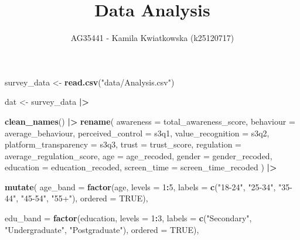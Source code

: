 \documentclass[
]{article}
\title{Data Analysis}
\author{AG35441 - Kamila Kwiatkowska (k25120717)}
\date{}
\newenvironment{Shaded}{\begin{snugshade}}{\end{snugshade}}
\newcommand{\AttributeTok}[1]{\textcolor[rgb]{0.13,0.29,0.53}{#1}}
\newcommand{\ConstantTok}[1]{\textcolor[rgb]{0.56,0.35,0.01}{#1}}
\newcommand{\DecValTok}[1]{\textcolor[rgb]{0.00,0.00,0.81}{#1}}
\newcommand{\FunctionTok}[1]{\textcolor[rgb]{0.13,0.29,0.53}{\textbf{#1}}}
\newcommand{\NormalTok}[1]{#1}
\newcommand{\OtherTok}[1]{\textcolor[rgb]{0.56,0.35,0.01}{#1}}
\newcommand{\SpecialCharTok}[1]{\textcolor[rgb]{0.81,0.36,0.00}{\textbf{#1}}}
\newcommand{\StringTok}[1]{\textcolor[rgb]{0.31,0.60,0.02}{#1}}
\begin{document}
\maketitle

\begin{Shaded}
\begin{Highlighting}[]
\NormalTok{survey\_data }\OtherTok{\textless{}{-}} \FunctionTok{read.csv}\NormalTok{(}\StringTok{"data/Analysis.csv"}\NormalTok{)}

\NormalTok{dat }\OtherTok{\textless{}{-}}\NormalTok{ survey\_data }\SpecialCharTok{|\textgreater{}} 
  
\FunctionTok{clean\_names}\NormalTok{() }\SpecialCharTok{|\textgreater{}}
  \FunctionTok{rename}\NormalTok{(}
    \AttributeTok{awareness             =}\NormalTok{ total\_awareness\_score,}
    \AttributeTok{behaviour             =}\NormalTok{ average\_behaviour,}
    \AttributeTok{perceived\_control     =}\NormalTok{ s3q1,}
    \AttributeTok{value\_recognition     =}\NormalTok{ s3q2,}
    \AttributeTok{platform\_transparency =}\NormalTok{ s3q3,}
    \AttributeTok{trust                 =}\NormalTok{ trust\_score,}
    \AttributeTok{regulation            =}\NormalTok{ average\_regulation\_score,}
    \AttributeTok{age                   =}\NormalTok{ age\_recoded,}
    \AttributeTok{gender                =}\NormalTok{ gender\_recoded,}
    \AttributeTok{education             =}\NormalTok{ education\_recoded,}
    \AttributeTok{screen\_time           =}\NormalTok{ screen\_time\_recoded}
\NormalTok{  ) }\SpecialCharTok{|\textgreater{}}

\FunctionTok{mutate}\NormalTok{(}
    \AttributeTok{age\_band    =} \FunctionTok{factor}\NormalTok{(age, }\AttributeTok{levels =} \DecValTok{1}\SpecialCharTok{:}\DecValTok{5}\NormalTok{,}
                         \AttributeTok{labels =} \FunctionTok{c}\NormalTok{(}\StringTok{"18{-}24"}\NormalTok{, }\StringTok{"25{-}34"}\NormalTok{, }\StringTok{"35{-}44"}\NormalTok{, }\StringTok{"45{-}54"}\NormalTok{, }\StringTok{"55+"}\NormalTok{),}
                         \AttributeTok{ordered =} \ConstantTok{TRUE}\NormalTok{),}
    
    \AttributeTok{edu\_band    =} \FunctionTok{factor}\NormalTok{(education, }\AttributeTok{levels =} \DecValTok{1}\SpecialCharTok{:}\DecValTok{3}\NormalTok{,}
                         \AttributeTok{labels =} \FunctionTok{c}\NormalTok{(}\StringTok{"Secondary"}\NormalTok{, }\StringTok{"Undergraduate"}\NormalTok{, }\StringTok{"Postgraduate"}\NormalTok{),}
                         \AttributeTok{ordered =} \ConstantTok{TRUE}\NormalTok{),}
    

\end{Highlighting}
\end{Shaded}
\end{document}
